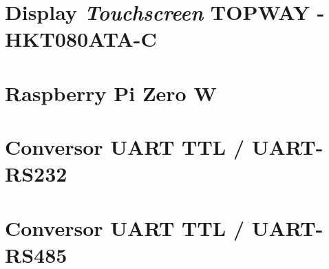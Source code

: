 
\section{Display \textit{Touchscreen} TOPWAY - HKT080ATA-C}

\section{Raspberry Pi Zero W}

\section{Conversor UART TTL / UART-RS232}
\section{Conversor UART TTL / UART-RS485}